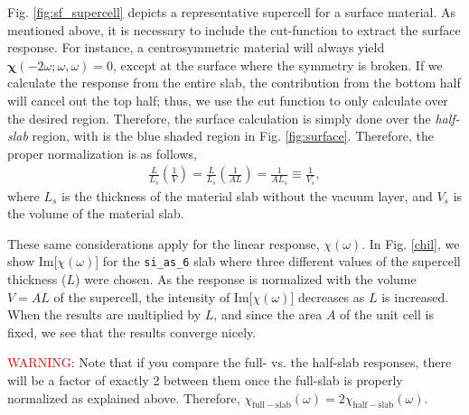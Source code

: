 \documentclass[letterpaper,10pt]{article}
\begin{document}
Fig. \ref{fig:sf_supercell} depicts a representative supercell for a surface
material. As mentioned above, it is necessary to include the cut-function to
extract the surface response. For instance, a centrosymmetric material will
always yield $\boldsymbol{\chi}(-2\omega;\omega,\omega) = 0$, except at the
surface where the symmetry is broken. If we calculate the response from the
entire slab, the contribution from the bottom half will cancel out the top half;
thus, we use the cut function to only calculate over the desired region.
Therefore, the surface calculation is simply done over the \emph{half-slab}
region, with is the blue shaded region in Fig. \ref{fig:surface}. Therefore, the
proper normalization is as follows,
\begin{align}\label{m1}
\frac{L}{L_{s}}\left(\frac{1}{V}\right) =
\frac{L}{L_{s}}\left(\frac{1}{AL}\right) =
\frac{1}{AL_{s}}\equiv\frac{1}{V_{s}},
\end{align}
where $L_{s}$ is the thickness of the material slab without the vacuum layer,
and $V_{s}$ is the volume of the material slab.

These same considerations apply for the linear response, $\chi(\omega)$. In Fig.
\ref{chil}, we show Im[$\chi(\omega)$] for the \verb=si_as_6= slab where three
different values of the supercell thickness ($L$) were chosen. As the response
is normalized with the volume $V = AL$ of the supercell, the intensity of
Im[$\chi(\omega)$] decreases as $L$ is increased. When the results are
multiplied by $L$, and since the area $A$ of the unit cell is fixed, we see that
the results converge nicely.

\textcolor{red}{WARNING}: Note that if you compare the full- vs. the half-slab
responses, there will be a factor of exactly 2 between them once the full-slab
is properly normalized as explained above. Therefore,
$\chi_{\mathrm{full-slab}}(\omega) = 2 \chi_{\mathrm{half-slab}}(\omega)$.
\end{document}
